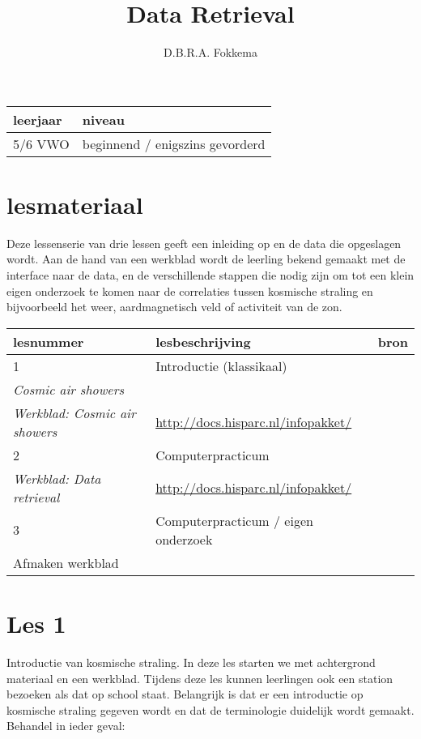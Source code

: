 

\title{Data Retrieval}
\author{D.B.R.A. Fokkema}



\maketitle

\begin{tabular}{|>{\raggedright}p{2.5cm}|>{\raggedright}p{12.5cm}|}
\hline
leerjaar & niveau \tabularnewline
\hline
5/6 VWO & beginnend / enigszins gevorderd\tabularnewline
\hline
\end{tabular}


\section{lesmateriaal}

Deze lessenserie van drie lessen geeft een inleiding op \hisparc en de
data die opgeslagen wordt. Aan de hand van een werkblad wordt de leerling
bekend gemaakt met de interface naar de \hisparc data, en de verschillende
stappen die nodig zijn om tot een klein eigen onderzoek te komen naar de
correlaties tussen kosmische straling en bijvoorbeeld het weer,
aardmagnetisch veld of activiteit van de zon.

\begin{tabular}{ |>{\raggedright}p{2.5cm}|>{\raggedright}p{8cm}|>{\raggedright}p{4cm}|}
\hline
lesnummer & lesbeschrijving & bron \tabularnewline
\hline
1 & Introductie (klassikaal) \\
\emph{Cosmic air showers} \\
\emph{Werkblad: Cosmic air showers}
& \url{http://docs.hisparc.nl/infopakket/} \tabularnewline
\hline
2 & Computerpracticum \\
\emph{Werkblad: Data retrieval}
& \url{http://docs.hisparc.nl/infopakket/} \tabularnewline
\hline
3 & Computerpracticum / eigen onderzoek \\
Afmaken werkblad
& \tabularnewline
\hline
\end{tabular}


\section{Les 1}

Introductie van kosmische straling. In deze les starten we met
achtergrond materiaal en een werkblad. Tijdens deze les kunnen
leerlingen ook een station bezoeken als dat op school staat. Belangrijk
is dat er een introductie op kosmische straling gegeven wordt en dat de
terminologie duidelijk wordt gemaakt.
Behandel in ieder geval:


